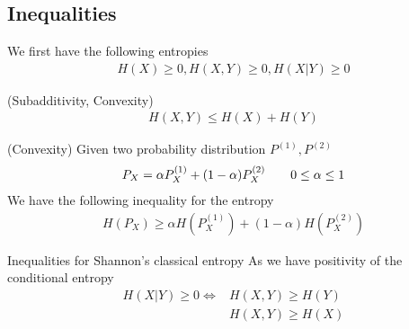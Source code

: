 \subsection{Inequalities}
We first have the following entropies
\begin{align*} 
	H\left(X\right) \geq 0, H\left(X, Y\right) \geq 0, H\left(X | Y\right) \geq 0 
\end{align*}

\begin{theoreme}{(Subadditivity, Convexity)}
\begin{align*} 
	H\left(X, Y\right) \leq H\left(X\right) + H\left(Y\right) 
\end{align*}
\end{theoreme}
\begin{theoreme}{(Convexity)}
	Given two probability distribution $P^{\left(1\right)}, P^{\left(2\right)}$
\begin{align*} 
	P_X =  \alpha P_X^{\left(1\right)} + \left(1 - \alpha\right)P_X^{\left(2\right)} \mathspace \mathspace 0 \leq \alpha \leq 1
\end{align*}
We have the following inequality for the entropy 
\begin{align*} 
	H\left(P_X\right) \geq \alpha H\left(P_X^{\left(1\right)}\right)  + \left(1 - \alpha\right)H\left(P_X^{\left(2\right)}\right)
\end{align*}
\end{theoreme}




\begin{parag}{Inequalities for Shannon's classical entropy}
    As we have positivity of the conditional entropy 
	\begin{align*} 
		H\left(X| Y\right) \geq 0 \iff &H\left(X, Y\right) \geq H\left(Y\right)\\
									   &H\left(X, Y\right) \geq H\left(X\right)
	\end{align*}
\end{parag}


